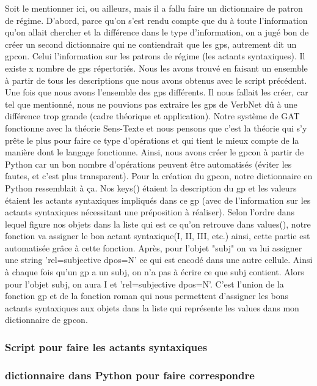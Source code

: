 \documentclass[12pt,maitrise,frenchb,natbib,twoside,initial]{dms}
\numberwithin{equation}{section}
\numberwithin{table}{chapter}
\numberwithin{figure}{chapter}
\begin{document}
Soit le mentionner ici, ou ailleurs, mais il a fallu faire un dictionnaire de patron de régime. D'abord, parce qu'on s'est rendu compte que du à toute l'information qu'on allait chercher et la différence dans le type d'information, on a jugé bon de créer un second dictionnaire qui ne contiendrait que les gps, autrement dit un gpcon. Celui l'information sur les patrons de régime (les actants syntaxiques). Il existe x nombre de gps répertoriés. Nous les avons trouvé en faisant un ensemble à partir de tous les descriptions que nous avons obtenus avec le script précédent. Une fois que nous avons l'ensemble des gps différents. Il nous fallait les créer, car tel que mentionné, nous ne pouvions pas extraire les gps de VerbNet dû à une différence trop grande (cadre théorique et application). Notre système de GAT fonctionne avec la théorie Sens-Texte et nous pensons que c'est la théorie qui s'y prête le plus pour faire ce type d'opérations et qui tient le mieux compte de la manière dont le langage fonctionne. Ainsi, nous avons créer le gpcon à partir de Python car un bon nombre d'opérations peuvent être automatisés (éviter les fautes, et c'est plus transparent). Pour la création du gpcon, notre dictionnaire en Python ressemblait à ça. Nos keys() étaient la description du gp et les valeurs étaient les actants syntaxiques impliqués dans ce gp (avec de l'information sur les actants syntaxiques nécessitant une préposition à réaliser). Selon l'ordre dans lequel figure nos objets dans la liste qui est ce qu'on retrouve dans values(), notre fonction va assigner le bon actant syntaxique(I, II, III, etc.) ainsi, cette partie est automatisée grâce à cette fonction. Après, pour l'objet "subj" on va lui assigner une string 'rel=subjective dpos=N' ce qui est encodé dans une autre cellule. Ainsi à chaque fois qu'un gp a  un subj, on n'a pas à écrire ce que subj contient. Alors pour l'objet subj, on aura I et 'rel=subjective dpos=N'. C'est l'union de la fonction gp et de la fonction roman qui nous permettent d'assigner les bons actants syntaxiques aux objets dans la liste qui représente les values dans mon dictionnaire de gpcon.
\subsubsection{Script pour faire les actants syntaxiques}
\subsubsection{dictionnaire dans Python pour faire correspondre }
\subsubsection{}
\end{document}
